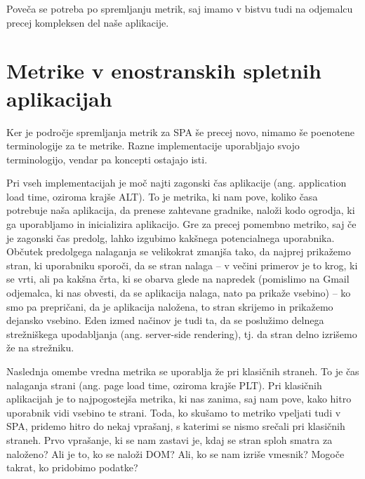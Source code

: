 \documentclass[a4paper, 12pt]{book}
\begin{document}
Poveča se potreba po spremljanju metrik, saj imamo v bistvu tudi na odjemalcu precej kompleksen del naše aplikacije.

\section{Metrike v enostranskih spletnih aplikacijah}

Ker je področje spremljanja metrik za SPA še precej novo, nimamo še poenotene terminologije za te metrike. Razne implementacije \cite{linkedin_rum}\cite{mezzurite_website} uporabljajo svojo terminologijo, vendar pa koncepti ostajajo isti.

Pri vseh implementacijah je moč najti zagonski čas aplikacije (ang. application load time, oziroma krajše ALT). To je metrika, ki nam pove, koliko časa potrebuje naša aplikacija, da prenese zahtevane gradnike, naloži kodo ogrodja, ki ga uporabljamo in inicializira aplikacijo. Gre za precej pomembno metriko, saj če je zagonski čas predolg, lahko izgubimo kakšnega potencialnega uporabnika. Občutek predolgega nalaganja se velikokrat zmanjša tako, da najprej prikažemo stran, ki uporabniku sporoči, da se stran nalaga – v večini primerov je to krog, ki se vrti, ali pa kakšna črta, ki se obarva glede na napredek (pomislimo na Gmail odjemalca, ki nas obvesti, da se aplikacija nalaga, nato pa prikaže vsebino) – ko smo pa prepričani, da je aplikacija naložena, to stran skrijemo in prikažemo dejansko vsebino. Eden izmed načinov je tudi ta, da se poslužimo delnega strežniškega upodabljanja (ang. server-side rendering), tj. da stran delno izrišemo že na strežniku.

Naslednja omembe vredna metrika se uporablja že pri klasičnih straneh. To je čas nalaganja strani (ang. page load time, oziroma krajše PLT). Pri klasičnih aplikacijah je to najpogostejša metrika, ki nas zanima, saj nam pove, kako hitro uporabnik vidi vsebino te strani. Toda, ko skušamo to metriko vpeljati tudi v SPA, pridemo hitro do nekaj vprašanj, s katerimi se nismo srečali pri klasičnih straneh. Prvo vprašanje, ki se nam zastavi je, kdaj se stran sploh smatra za naloženo? Ali je to, ko se naloži DOM? Ali, ko se nam izriše vmesnik? Mogoče takrat, ko pridobimo podatke?
\end{document}
